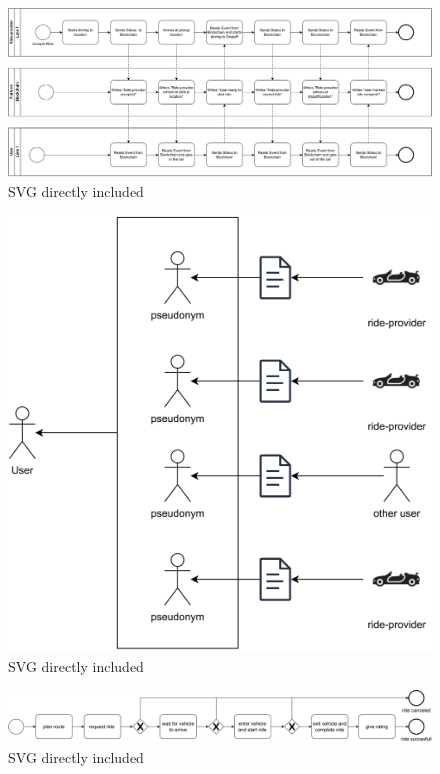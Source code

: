 \begin{figure}
    \centering
    \includegraphics[width=\linewidth]{data/1.svg}
    \caption{SVG directly included}
    \label{fig:directSVG}
\end{figure}







\begin{figure}
    \centering
    \includegraphics[width=\linewidth]{data/2.svg}
    \caption{SVG directly included}
    \label{fig:directSVG}
\end{figure}







\begin{figure}
    \centering
    \includegraphics[width=\linewidth]{data/3.svg}
    \caption{SVG directly included}
    \label{fig:directSVG}
\end{figure}







